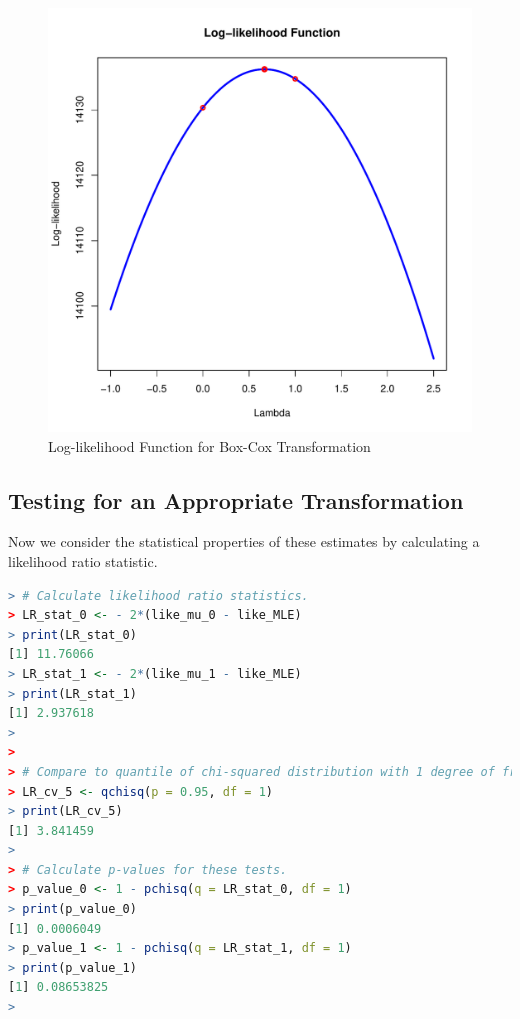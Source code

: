 \documentclass[11pt]{book}
\begin{document}
\begin{figure}[h!]
  \centering
  \includegraphics[scale = 0.5, keepaspectratio=true]{../Figures/box_cox_loglike_uni}
  \caption{Log-likelihood Function for Box-Cox Transformation} \label{fig:box_cox_loglike_uni}
\end{figure}


\pagebreak
\subsection{Testing for an Appropriate Transformation}

Now we consider the statistical properties of these estimates
by calculating a likelihood ratio statistic.

\begin{lstlisting}[language=R]
> # Calculate likelihood ratio statistics.
> LR_stat_0 <- - 2*(like_mu_0 - like_MLE)
> print(LR_stat_0)
[1] 11.76066
> LR_stat_1 <- - 2*(like_mu_1 - like_MLE)
> print(LR_stat_1)
[1] 2.937618
> 
> 
> # Compare to quantile of chi-squared distribution with 1 degree of freedom.
> LR_cv_5 <- qchisq(p = 0.95, df = 1)
> print(LR_cv_5)
[1] 3.841459
> 
> # Calculate p-values for these tests.
> p_value_0 <- 1 - pchisq(q = LR_stat_0, df = 1)
> print(p_value_0)
[1] 0.0006049
> p_value_1 <- 1 - pchisq(q = LR_stat_1, df = 1)
> print(p_value_1)
[1] 0.08653825
> 
\end{lstlisting}
\end{document}
